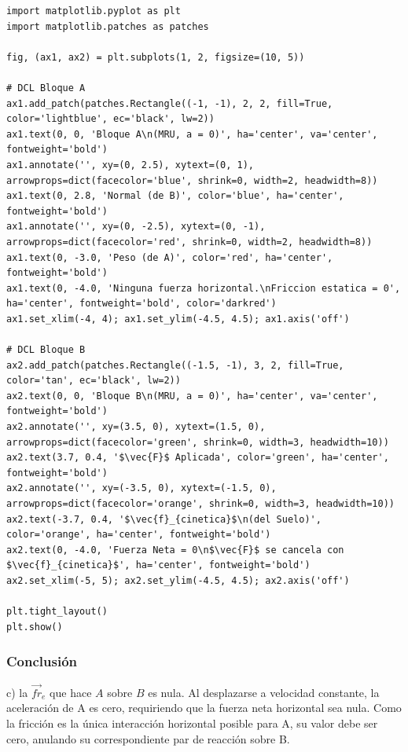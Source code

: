 \documentclass[12pt]{article}
\begin{document}
\begin{lstlisting}
import matplotlib.pyplot as plt
import matplotlib.patches as patches

fig, (ax1, ax2) = plt.subplots(1, 2, figsize=(10, 5))

# DCL Bloque A
ax1.add_patch(patches.Rectangle((-1, -1), 2, 2, fill=True, color='lightblue', ec='black', lw=2))
ax1.text(0, 0, 'Bloque A\n(MRU, a = 0)', ha='center', va='center', fontweight='bold')
ax1.annotate('', xy=(0, 2.5), xytext=(0, 1), arrowprops=dict(facecolor='blue', shrink=0, width=2, headwidth=8))
ax1.text(0, 2.8, 'Normal (de B)', color='blue', ha='center', fontweight='bold')
ax1.annotate('', xy=(0, -2.5), xytext=(0, -1), arrowprops=dict(facecolor='red', shrink=0, width=2, headwidth=8))
ax1.text(0, -3.0, 'Peso (de A)', color='red', ha='center', fontweight='bold')
ax1.text(0, -4.0, 'Ninguna fuerza horizontal.\nFriccion estatica = 0', ha='center', fontweight='bold', color='darkred')
ax1.set_xlim(-4, 4); ax1.set_ylim(-4.5, 4.5); ax1.axis('off')

# DCL Bloque B
ax2.add_patch(patches.Rectangle((-1.5, -1), 3, 2, fill=True, color='tan', ec='black', lw=2))
ax2.text(0, 0, 'Bloque B\n(MRU, a = 0)', ha='center', va='center', fontweight='bold')
ax2.annotate('', xy=(3.5, 0), xytext=(1.5, 0), arrowprops=dict(facecolor='green', shrink=0, width=3, headwidth=10))
ax2.text(3.7, 0.4, '$\vec{F}$ Aplicada', color='green', ha='center', fontweight='bold')
ax2.annotate('', xy=(-3.5, 0), xytext=(-1.5, 0), arrowprops=dict(facecolor='orange', shrink=0, width=3, headwidth=10))
ax2.text(-3.7, 0.4, '$\vec{f}_{cinetica}$\n(del Suelo)', color='orange', ha='center', fontweight='bold')
ax2.text(0, -4.0, 'Fuerza Neta = 0\n$\vec{F}$ se cancela con $\vec{f}_{cinetica}$', ha='center', fontweight='bold')
ax2.set_xlim(-5, 5); ax2.set_ylim(-4.5, 4.5); ax2.axis('off')

plt.tight_layout()
plt.show()
\end{lstlisting}

\subsubsection*{Conclusión}
c) la $\vec{fr}_e$ que hace $A$ sobre $B$ es nula. Al desplazarse a velocidad constante, la aceleración de A es cero, requiriendo que la fuerza neta horizontal sea nula. Como la fricción es la única interacción horizontal posible para A, su valor debe ser cero, anulando su correspondiente par de reacción sobre B.

\newpage
\end{document}
